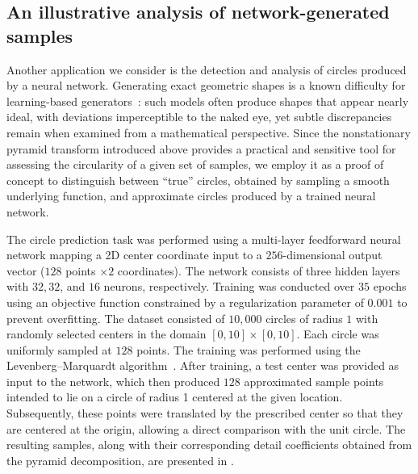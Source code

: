 \documentclass[11pt,a4paper]{article}
\theoremstyle{definition}
\begin{document}
\subsection{An illustrative analysis of network-generated samples}
\label{sec:NN detection}

Another application we consider is the detection and analysis of circles produced by a neural network. Generating exact geometric shapes is a known difficulty for learning-based generators~\cite{Chen2019, Park2019}: such models often produce shapes that appear nearly ideal, with deviations imperceptible to the naked eye, yet subtle discrepancies remain when examined from a mathematical perspective. Since the nonstationary pyramid transform introduced above provides a practical and sensitive tool for assessing the circularity of a given set of samples, we employ it as a proof of concept to distinguish between ``true'' circles, obtained by sampling a smooth underlying function, and approximate circles produced by a trained neural network.

The circle prediction task was performed using a multi-layer feedforward neural network mapping a 2D center coordinate input to a $256$-dimensional output vector ($128$ points $\times 2$ coordinates). The network consists of three hidden layers with $32, 32$, and $16$ neurons, respectively. Training was conducted over $35$ epochs using an objective function constrained by a regularization parameter of $0.001$ to prevent overfitting. The dataset consisted of $10,000$ circles of radius $1$ with randomly selected centers in the domain $[0,10]\times[0,10]$. Each circle was uniformly sampled at $128$ points. The training was performed using the Levenberg--Marquardt algorithm~\cite{levenberg1944method, marquardt1963method}. After training, a test center was provided as input to the network, which then produced $128$ approximated sample points intended to lie on a circle of radius 1 centered at the given location. Subsequently, these points were translated by the prescribed center so that they are centered at the origin, allowing a direct comparison with the unit circle. The resulting samples, along with their corresponding detail coefficients obtained from the pyramid decomposition, are presented in . 
\end{document}
